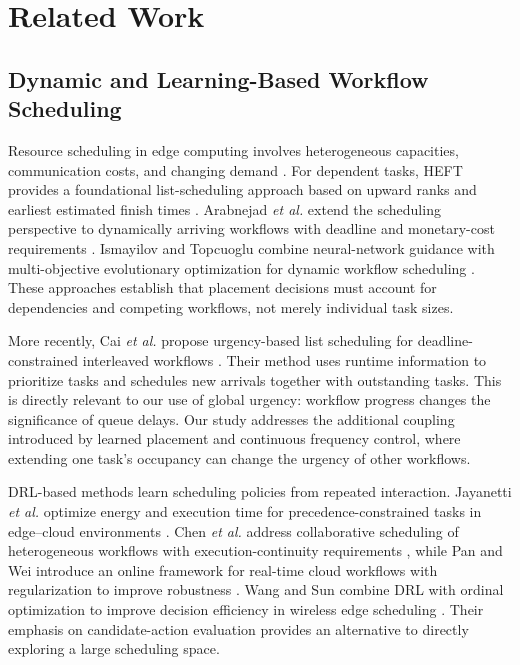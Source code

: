\documentclass[lettersize,journal]{IEEEtran}
\begin{document}
\section{Related Work}
\label{sec:related_work}

\subsection{Dynamic and Learning-Based Workflow Scheduling}

Resource scheduling in edge computing involves heterogeneous capacities,
communication costs, and changing demand \cite{luo2021survey}. For
dependent tasks, HEFT provides a foundational list-scheduling approach
based on upward ranks and earliest estimated finish times
\cite{topcuoglu2002}. Arabnejad \emph{et al.} extend the scheduling
perspective to dynamically arriving workflows with deadline and
monetary-cost requirements \cite{arabnejad2019}. Ismayilov and Topcuoglu
combine neural-network guidance with multi-objective evolutionary
optimization for dynamic workflow scheduling \cite{ismayilov2020}.
These approaches establish that placement decisions must account for
dependencies and competing workflows, not merely individual task sizes.

More recently, Cai \emph{et al.} propose urgency-based list scheduling for
deadline-constrained interleaved workflows \cite{cai2025interleaved}.
Their method uses runtime information to prioritize tasks and schedules
new arrivals together with outstanding tasks. This is directly relevant
to our use of global urgency: workflow progress changes the significance
of queue delays. Our study addresses the additional coupling introduced
by learned placement and continuous frequency control, where extending
one task's occupancy can change the urgency of other workflows.

DRL-based methods learn scheduling policies from repeated interaction.
Jayanetti \emph{et al.} optimize energy and execution time for
precedence-constrained tasks in edge--cloud environments
\cite{jayanetti2022}. Chen \emph{et al.} address collaborative scheduling
of heterogeneous workflows with execution-continuity requirements
\cite{chen2023}, while Pan and Wei introduce an online framework for
real-time cloud workflows with regularization to improve robustness
\cite{pan2024}. Wang and Sun combine DRL with ordinal optimization to
improve decision efficiency in wireless edge scheduling
\cite{wang2025ordinal}. Their emphasis on candidate-action evaluation
provides an alternative to directly exploring a large scheduling space.
\end{document}
